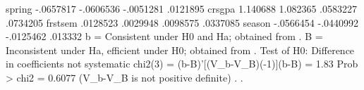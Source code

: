       spring {\VBAR}   -.0657817    -.0606536       -.0051281        .0121895
      crsgpa {\VBAR}    1.140688     1.082365        .0583227        .0734205
     frstsem {\VBAR}    .0128523     .0029948        .0098575        .0337085
      season {\VBAR}   -.0566454    -.0440992       -.0125462         .013332
                          b = Consistent under H0 and Ha; obtained from {}.
           B = Inconsistent under Ha, efficient under H0; obtained from {}.
{\smallskip}
Test of H0: Difference in coefficients not systematic
{\smallskip}
    chi2(3) = (b-B)'[(V_b-V_B){\caret}(-1)](b-B)
            =   1.83
Prob > chi2 = 0.6077
(V_b-V_B is not positive definite)
{\smallskip}
. 
. 

